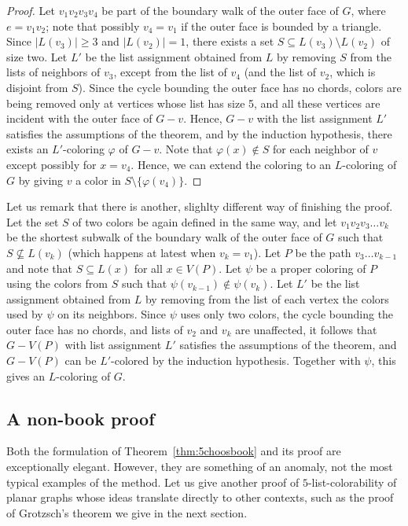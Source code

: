 \documentclass[12pt,twoside,openright,a4paper]{book}
\begin{document}
\begin{proof}
Let $v_1v_2v_3v_4$ be part of the boundary walk of the outer face of $G$, where $e=v_1v_2$; note that possibly $v_4=v_1$
if the outer face is bounded by a triangle.  Since $|L(v_3)|\ge 3$ and $|L(v_2)|=1$, there exists a set $S\subseteq L(v_3)\setminus L(v_2)$
of size two.  Let $L'$ be the list assignment obtained from $L$ by removing $S$ from the lists of neighbors of $v_3$, except
from the list of $v_4$ (and the list of $v_2$, which is disjoint from $S$).  Since the cycle bounding the outer
face has no chords, colors are being removed only at vertices whose list has size 5, and all these vertices are incident
with the outer face of $G-v$.  Hence, $G-v$ with the list assignment $L'$ satisfies the assumptions of the theorem, and
by the induction hypothesis, there exists an $L'$-coloring $\varphi$ of $G-v$.  Note that $\varphi(x)\not\in S$ for
each neighbor of $v$ except possibly for $x=v_4$.  Hence, we can extend the coloring to an $L$-coloring of $G$ by giving $v$
a color in $S\setminus\{\varphi(v_4)\}$.
\end{proof}

Let us remark that there is another, slighlty different way of finishing the proof.  Let the set $S$ of two colors
be again defined in the same way, and let $v_1v_2v_3\ldots v_k$ be the shortest subwalk of the boundary walk of the outer face
of $G$ such that $S\not\subseteq L(v_k)$ (which happens at latest when $v_k=v_1$).  Let $P$ be the path $v_3\ldots v_{k-1}$
and note that $S\subseteq L(x)$ for all $x\in V(P)$.  Let $\psi$ be a proper coloring of $P$ using the colors from $S$
such that $\psi(v_{k-1})\not\in\psi(v_k)$.  Let $L'$ be the list assignment obtained from $L$ by removing from the list
of each vertex the colors used by $\psi$ on its neighbors.  Since $\psi$ uses only two colors, the cycle bounding the outer
face has no chords, and lists of $v_2$ and $v_k$ are unaffected, it follows that $G-V(P)$ with list assignment $L'$
satisfies the assumptions of the theorem, and $G-V(P)$ can be $L'$-colored by the induction hypothesis.  Together with $\psi$,
this gives an $L$-coloring of $G$.

\subsection{A non-book proof}

Both the formulation of Theorem~\ref{thm:5choosbook} and its proof are exceptionally elegant.
However, they are something of an anomaly, not the most typical examples of the method.
Let us give another proof of $5$-list-colorability of planar graphs whose ideas translate directly to other
contexts, such as the proof of Grotzsch's theorem we give in the next section.
\end{document}
